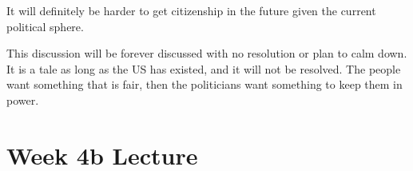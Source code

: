 \documentclass{article}
\begin{document}
It will definitely be harder to get citizenship in the future given the current political
sphere.

This discussion will be forever discussed with no resolution or plan to calm down.
It is a tale as long as the US has existed, and it will not be resolved.
The people want something that is fair, then the politicians want something
to keep them in power.

\section*{Week 4b Lecture}
\end{document}
